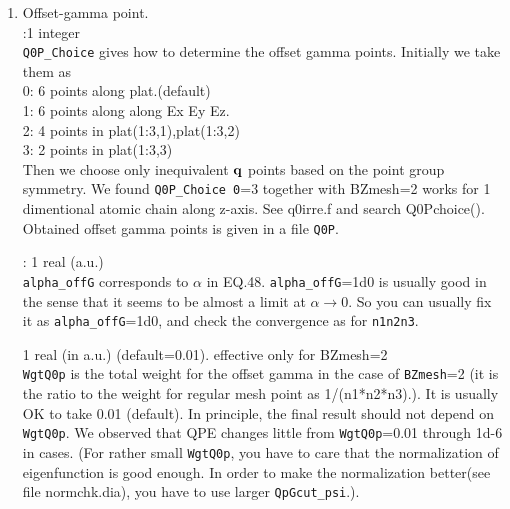 \documentclass[a4paper,10pt,epsf,fleqn]{article}
\newcommand{\keyw}[1]{\fbox{\tt #1}}
\begin{document}
{\begin{enumerate}
\keyw{deltaw}: 1 real (a.u.) only for one-shot case.

{\tt deltaw} is the interval for the numerical derivative
$\frac{\partial \Sigma(\omega)}{\partial \omega}$ in EQ.8.
We calculate $\langle \psi^{{\bf k}n} |\Sigma(\epsilon^{{\bf k}n}+{\tt deltaw}) |\psi^{{\bf k}n} \rangle$ 
and $\langle \psi^{{\bf k}n} |\Sigma(\psi^{{\bf k}n}\!-\!{\tt deltaw})|\psi^{{\bf k}n} \rangle$
in addition to $\langle \psi^{{\bf k}n} |\Sigma(\epsilon^{{\bf k}n})|\psi^{{\bf k}n} \rangle$.
From these values, we can calcuate two $Z$ (or second-derivative of $\Sigma(\omega)$), as shown
in {\sf SECU}. It will help to see whether the used \verb#deltaw# is O.K. or not.

\item Offset-gamma point.\\
\keyw{Q0P\_Choice 0}:1 integer\\
{\tt Q0P\_Choice} gives how to determine the offset gamma points.
Initially we take them as\\
0: 6 points along plat.(default)\\
1: 6 points along along Ex Ey Ez. \\
2: 4 points in plat(1:3,1),plat(1:3,2)\\
3: 2 points in plat(1:3,3)\\
Then we choose only inequivalent ${\bf q}$ points
based on the point group symmetry.
We found {\tt Q0P\_Choice 0}=3 together with BZmesh=2 
works for 1 dimentional atomic chain along z-axis. 
See q0irre.f and search Q0Pchoice().
Obtained offset gamma points is given in a file {\tt Q0P}.

\keyw{alpha\_offG}: 1 real (a.u.) \\
{\tt alpha\_offG} corresponds to $\alpha$ in EQ.48.
{\tt alpha\_offG}=1d0 is usually good in the sense that
it seems to be almost a limit at $\alpha \to 0$.
So you can usually fix it as {\tt alpha\_offG}=1d0, and check the
convergence as for {\tt n1n2n3}.


\keyw{WgtQ0p } 1 real (in a.u.) (default=0.01). effective only for BZmesh=2\\
{\tt WgtQ0p} is the total weight for the offset gamma 
in the case of {\tt BZmesh}=2
(it is the ratio to the weight for regular mesh point as 1/(n1*n2*n3).).
It is usually OK to take 0.01 (default).
In principle, the final result should not depend on {\tt WgtQ0p}.
We observed that QPE changes little from {\tt WgtQ0p}=0.01 through 1d-6 in cases.
(For rather small {\tt WgtQ0p}, you have to care that the normalization of eigenfunction is 
good enough. In order to make the normalization better(see file normchk.dia), 
you have to use larger {\tt QpGcut\_psi}.). \\


\end{enumerate}}
\end{document}
